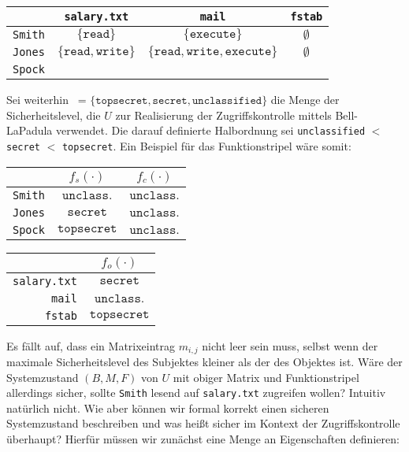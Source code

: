 \begin{center}
	\begin{tabular}{r||c|c|c}
        		& \texttt{salary.txt} & \texttt{mail} & \texttt{fstab} \\
      		\hline
      		\texttt{Smith} & \(\{\texttt{read}\}\) & \(\{\texttt{execute}\}\) & \(\emptyset\) \\
      		\texttt{Jones} & \(\{\texttt{read},\texttt{write}\}\) & \(\{\texttt{read},\texttt{write},\texttt{execute}\}\) & \(\emptyset\) \\
      		\texttt{Spock} & \calA    & \calA       & \calA
	\end{tabular}
\end{center}

Sei weiterhin \calL\ = \(\{\texttt{topsecret}, \texttt{secret}, \texttt{unclassified}\}\) die Menge der Sicherheitslevel, die
\(U\) zur Realisierung der Zugriffskontrolle mittels Bell-LaPadula verwendet. Die darauf definierte Halbordnung sei \texttt{unclassified} \(<\) \texttt{secret} \(<\) \texttt{topsecret}. Ein Beispiel für das Funktionstripel wäre somit:

\begin{center}
      \begin{tabular}{r||c|c}
       & \(f_s(\cdot)\) & \(f_c(\cdot)\) \\
      \hline
      \texttt{Smith} & \(\texttt{unclass.}\) & \(\texttt{unclass.}\) \\
      \texttt{Jones} & \(\texttt{secret}\) & \(\texttt{unclass.}\) \\
      \texttt{Spock} & \(\texttt{topsecret}\) & \(\texttt{unclass.}\)
      \end{tabular}
      \quad
      \begin{tabular}{r||c}
       & \(f_o(\cdot)\) \\
      \hline
      \texttt{salary.txt} & \(\texttt{secret}\) \\
      \texttt{mail} & \(\texttt{unclass.}\) \\
      \texttt{fstab} & \(\texttt{topsecret}\)
      \end{tabular}
\end{center}

Es fällt auf, dass ein Matrixeintrag \(m_{i, j}\) nicht leer sein muss, selbst wenn der maximale Sicherheitslevel des Subjektes
kleiner als der des Objektes ist. Wäre der Systemzustand \((B, M, F)\) von \(U\) mit obiger Matrix und Funktionstripel allerdings
sicher, sollte \texttt{Smith} lesend auf \texttt{salary.txt} zugreifen wollen? Intuitiv natürlich nicht. Wie aber können wir
formal korrekt einen sicheren Systemzustand beschreiben und was heißt sicher im Kontext der Zugriffskontrolle überhaupt? Hierfür müssen wir zunächst eine Menge an Eigenschaften definieren:

